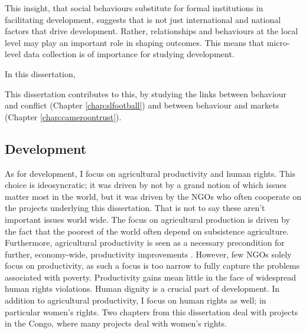 This insight, that social behaviours substitute for formal institutions in facilitating development, suggests that is not just international and national factors that drive development. Rather, relationships and behaviours at the local level may play an important role in shaping outcomes. This means that micro-level data collection is of importance for studying development. 

In this dissertation,  



This dissertation contributes to this, by studying the links between behaviour and conflict (Chapter \ref{chap:slfootball}) and between behaviour and markets (Chapter \ref{chap:cameroontrust}).


\subsection{Development}
As for development, I focus on agricultural productivity and human rights. This choice is ideosyncratic; it was driven by not by a grand notion of which issues matter most in the world, but it was driven by the NGOs who often cooperate on the projects underlying this dissertation. That is not to say these aren't important issues world wide. The focus on agricultural production is driven by the fact that the poorest of the world often depend on subsistence agriculture. Furthermore, agricultural productivity is seen as a necessary precondition for further, economy-wide, productivity improvements \citep{WorldBank2008}. However, few NGOs solely focus on productivity, as such a focus is too narrow to fully capture the problems associated with poverty. Productivity gains mean little in the face of widespread human rights violations. Human dignity is a crucial part of development. In addition to agricultural productivity, I focus on human rights as well; in particular women's rights. Two chapters from this dissertation deal with projects in the Congo, where many projects deal with women's rights. 

